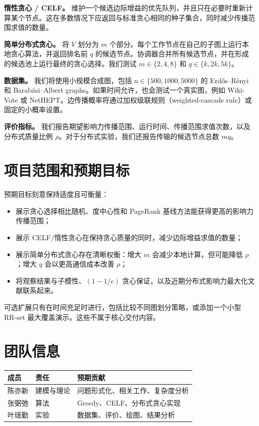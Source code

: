 \documentclass[10pt]{ctexart}
\begin{document}
\textbf{惰性贪心 / CELF。} 维护一个候选边际增益的优先队列，并且只在必要时重新计算某个节点。这在多数情况下应返回与标准贪心相同的种子集合，同时减少传播范围求值的数量。

\textbf{简单分布式贪心。} 将 $V$ 划分为 $m$ 个部分。每个工作节点在自己的子图上运行本地贪心算法，并返回排名前 $q$ 的候选节点。协调器合并所有候选节点，并在形成的候选池上运行最终的贪心选择。我们测试 $m\in\{2,4,8\}$ 和 $q\in\{k,2k,5k\}$。

\textbf{数据集。} 我们将使用小规模合成图，包括 $n\in\{500,1000,5000\}$ 的 Erd\H{o}s--R\'{e}nyi 和 Barab\'{a}si--Albert graphs。如果时间允许，也会测试一个真实图，例如 Wiki-Vote 或 NetHEPT。边传播概率将通过加权级联规则（weighted-cascade rule）或固定的小概率设置。

\textbf{评价指标。} 我们报告期望影响力传播范围、运行时间、传播范围求值次数，以及分布式质量比例 $\rho$。对于分布式实验，我们还报告传输的候选节点总数 $mq$。

\section{项目范围和预期目标}
预期目标刻意保持适度且可衡量：
\begin{itemize}
\item 展示贪心选择相比随机、度中心性和 PageRank 基线方法能获得更高的影响力传播范围；
\item 展示 CELF/惰性贪心在保持贪心质量的同时，减少边际增益求值的数量；
\item 展示简单分布式贪心存在清晰权衡：增大 $m$ 会减少本地计算，但可能降低 $\rho$；增大 $q$ 会以更高通信成本改善 $\rho$；
\item 将观察结果与子模性、$(1-1/e)$ 贪心保证，以及近期分布式影响力最大化文献联系起来。
\end{itemize}

可选扩展只有在时间充足时进行，包括比较不同图划分策略，或添加一个小型 RR-set 最大覆盖演示。这些不属于核心交付内容。

\section{团队信息}
\begin{center}
\begin{tabular}{lll}
\toprule
成员 & 责任 & 预期贡献 \\
\midrule
陈亦新 & 建模与理论 & 问题形式化、相关工作、复杂度分析 \\
张弼弛 & 算法 & Greedy、CELF、分布式贪心实现 \\
叶瑶勤 & 实验 & 数据集、评价、绘图、结果分析 \\
\bottomrule
\end{tabular}
\end{center}
\end{document}
